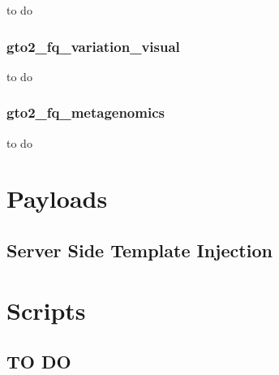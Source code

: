 \documentclass[11pt,]{krantz}
\begin{document}
to do

\section{gto2\_fq\_variation\_visual}\label{gto2_fq_variation_visual}

to do

\section{gto2\_fq\_metagenomics}\label{gto2_fq_metagenomics}

to do

\part{Payloads}\label{part-payloads}

\chapter{Server Side Template Injection}\label{server-side-template-injection}

\part{Scripts}\label{part-scripts}

\chapter{TO DO}\label{to-do}



\printindex
\end{document}
